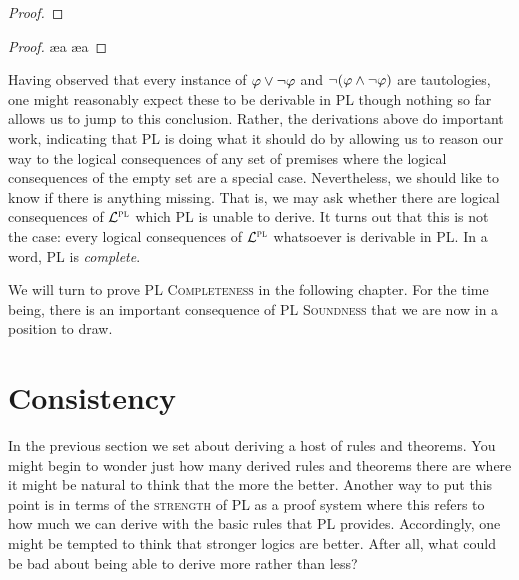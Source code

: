 \begin{multicols}{2}
  
\begin{proof}
	 
\end{proof}

\begin{proof}
  \open 
     
     \ae{a}
     \ae{a}
  \close
   
\end{proof}

\end{multicols}

Having observed that every instance of $\varphi \vee \neg \varphi$ and $\neg(\varphi \wedge \neg \varphi)$ are tautologies, one might reasonably expect these to be derivable in PL though nothing so far allows us to jump to this conclusion.
Rather, the derivations above do important work, indicating that PL is doing what it should do by allowing us to reason our way to the logical consequences of any set of premises where the logical consequences of the empty set are a special case.
Nevertheless, we should like to know if there is anything missing.
That is, we may ask whether there are logical consequences of $\mathcal{L}^{\textsc{pl}}$ which PL is unable to derive.
It turns out that this is not the case: every logical consequences of $\mathcal{L}^{\textsc{pl}}$ whatsoever is derivable in PL.
In a word, PL is \textit{complete}.

We will turn to prove \textsc{PL Completeness} in the following chapter.
For the time being, there is an important consequence of \textsc{PL Soundness} that we are now in a position to draw.






\section{Consistency}

In the previous section we set about deriving a host of rules and theorems.
You might begin to wonder just how many derived rules and theorems there are where it might be natural to think that the more the better.
Another way to put this point is in terms of the \textsc{strength} of PL as a proof system where this refers to how much we can derive with the basic rules that PL provides.
Accordingly, one might be tempted to think that stronger logics are better.
After all, what could be bad about being able to derive more rather than less?

